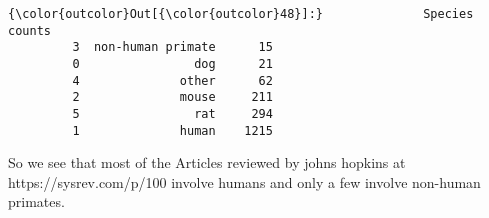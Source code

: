 \documentclass[11pt]{article}
\begin{document}
\begin{Verbatim}[commandchars=\\\{\}]
{\color{outcolor}Out[{\color{outcolor}48}]:}              Species  counts
         3  non-human primate      15
         0                dog      21
         4              other      62
         2              mouse     211
         5                rat     294
         1              human    1215
\end{Verbatim}
            
    So we see that most of the Articles reviewed by johns hopkins at
https://sysrev.com/p/100 involve humans and only a few involve non-human
primates.


    
    
    
    
\end{document}
